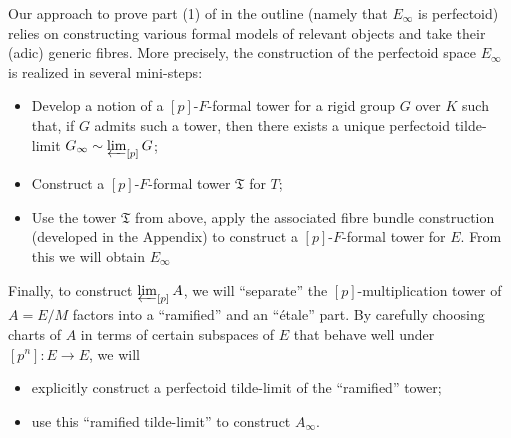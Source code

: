 \documentclass[10pt,oneside]{amsart}
\theoremstyle{definition}
\newtheorem{remark*}[mainthm]{Remark}
\begin{document}
\vspace*{0.2cm}
Our approach to prove part (1) of in the outline (namely that $E_\infty$ is perfectoid) relies on constructing various formal models of relevant objects and take their (adic) generic fibres. More precisely, the construction of the perfectoid space $E_\infty$ is realized in several mini-steps: 
\begin{itemize}
\item Develop a notion of a $[p]$-$F$-formal tower for a rigid group $G$ over $K$ such that, if $G$ admits such a tower, then there exists a unique perfectoid tilde-limit $G_\infty \sim  \varprojlim_{[p]} G$; 
\item Construct a $[p]$-$F$-formal tower $\mathfrak T$ for $T$;
\item Use the tower $\mathfrak T$ from above, apply the  associated fibre bundle construction (developed in the Appendix) to construct a $[p]$-$F$-formal tower for $E$. From this we will obtain $E_\infty$
\end{itemize}
 
 
\vspace*{0.2cm}
Finally, to construct $\varprojlim_{[p]} A$, we will ``separate'' the $[p]$-multiplication tower of $A = E/M$ factors into a ``ramified'' and an ``\'etale'' part. By carefully choosing charts of $A$ in terms of certain subspaces of $E$ that behave well under $[p^n]:E\rightarrow E$, we will 
\begin{itemize}
\item explicitly construct a perfectoid tilde-limit of the ``ramified'' tower; 
\item use this ``ramified tilde-limit'' to construct $A_\infty$. 
\end{itemize}

 

\vspace*{0.2cm}
\end{document}
